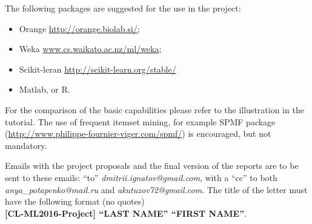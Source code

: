 \documentclass[12pt]{article}         %
\begin{document}
The following packages are suggested for the use in the project:
\begin{itemize}
  \item Orange \url{http://orange.biolab.si/};
  \item Weka \url{www.cs.waikato.ac.nz/ml/weka};
  \item Scikit-leran \url{http://scikit-learn.org/stable/}
  \item Matlab, or R.
\end{itemize}
For the comparison of the basic capabilities please refer to the illustration in the tutorial.
The use of frequent itemset mining, for example SPMF package (\url{http://www.philippe-fournier-viger.com/spmf/})
is encouraged, but not mandatory.

Emails with the project proposals and the final version of the reports are to be sent to these emails:
``to'' \textit{dmitrii.ignatov@gmail.com}, with a ``cc'' to both \textit{anya\_potapenko@mail.ru} and
\textit{akutuzov72@gmail.com}.
The title of the letter must have the following format (no quotes)\hfill\\
\textbf{[CL-ML2016-Project] ``LAST NAME'' ``FIRST NAME''}.
\end{document}
